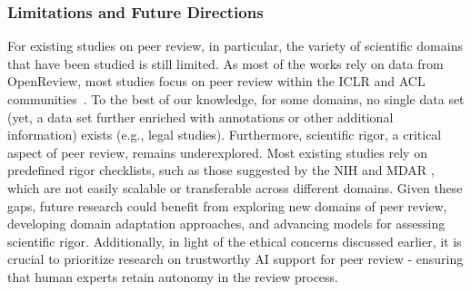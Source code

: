 \subsubsection{Limitations and Future Directions}
For existing studies on peer review, in particular, the variety of scientific domains that have been studied is still limited. As most of the works rely on data from OpenReview, most studies focus on peer review within the ICLR and ACL communities~\cite[e.g.,][]{Choudhary_2021,kennard-etal-2022-disapere}. 
To the best of our knowledge, for some domains, no single data set (yet, a data set further enriched with annotations or other additional information) exists (e.g., legal studies). 
Furthermore, scientific rigor, a critical aspect of peer review, remains underexplored. Most existing studies rely on predefined rigor checklists, such as those suggested by the NIH and MDAR \cite{chambers2019towards}, which are not easily scalable or transferable across different domains. 
Given these gaps, future research could benefit from exploring new domains of peer review, developing domain adaptation approaches, and advancing models for assessing scientific rigor. Additionally, in light of the ethical concerns discussed earlier, it is crucial to prioritize research on trustworthy AI support for peer review - ensuring that human experts retain autonomy in the review process. 



